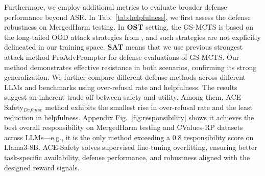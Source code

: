 \documentclass[11pt]{article}
\def\framework{ACE-Safety}
\def\attackmethod{GS-MCTS}
\begin{document}
Furthermore, we employ additional metrics to evaluate broader defense performance beyond ASR. In Tab.~\ref{tab:helpfulness}, we first assess the defense robustness on MergedHarm testing. In \textbf{OST} setting, the {\attackmethod} is based on the long-tailed OOD attack strategies from \citet{jiang2024wildteaming}, and such strategies are not explicitly delineated in our training space. \textbf{SAT} means that we use previous strongest attack method ProAdvPrompter for defense evaluations of {\attackmethod}. Our method demonstrates effective resistance in both scenarios, confirming its strong generalization. We further compare different defense methods across different LLMs and benchmarks using over-refusal rate and helpfulness. The results suggest an inherent trade-off between safety and utility. Among them, {\framework}$_{Defense}$ method exhibits the smallest rise in over-refusal rate and the least reduction in helpfulness. Appendix Fig.~\ref{fig:responsibility} shows it achieves the best overall responsibility on MergedHarm testing and CValues-RP datasets across LLMs—e.g., it is the only method exceeding a 0.8 responsibility score on Llama3-8B. {\framework} solves supervised fine-tuning overfitting, ensuring better task-specific availability, defense performance, and robustness aligned with the designed reward signals.






\end{document}

